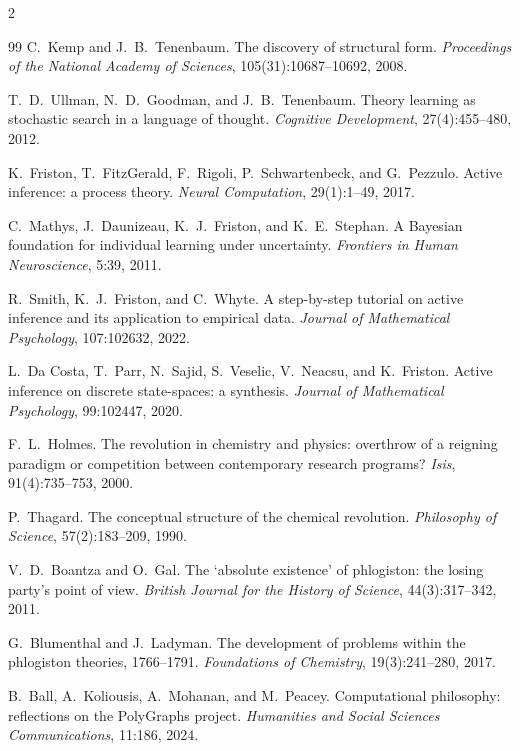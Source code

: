 \documentclass[11pt]{article}
\begin{document}
\begin{multicols}{2}
\begin{thebibliography}{99}
C.~Kemp and J.~B.~Tenenbaum.
The discovery of structural form.
\emph{Proceedings of the National Academy of Sciences}, 105(31):10687--10692, 2008.

T.~D.~Ullman, N.~D.~Goodman, and J.~B.~Tenenbaum.
Theory learning as stochastic search in a language of thought.
\emph{Cognitive Development}, 27(4):455--480, 2012.

K.~Friston, T.~FitzGerald, F.~Rigoli, P.~Schwartenbeck, and G.~Pezzulo.
Active inference: a process theory. \emph{Neural Computation}, 29(1):1--49, 2017.

C.~Mathys, J.~Daunizeau, K.~J.~Friston, and K.~E.~Stephan.
A Bayesian foundation for individual learning under uncertainty.
\emph{Frontiers in Human Neuroscience}, 5:39, 2011.

R.~Smith, K.~J.~Friston, and C.~Whyte.
A step-by-step tutorial on active inference and its application to empirical data.
\emph{Journal of Mathematical Psychology}, 107:102632, 2022.

L.~Da Costa, T.~Parr, N.~Sajid, S.~Veselic, V.~Neacsu, and K.~Friston.
Active inference on discrete state-spaces: a synthesis.
\emph{Journal of Mathematical Psychology}, 99:102447, 2020.

F.~L.~Holmes.
The revolution in chemistry and physics: overthrow of a reigning paradigm or competition between
contemporary research programs? \emph{Isis}, 91(4):735--753, 2000.

P.~Thagard.
The conceptual structure of the chemical revolution.
\emph{Philosophy of Science}, 57(2):183--209, 1990.

V.~D.~Boantza and O.~Gal.
The `absolute existence' of phlogiston: the losing party's point of view.
\emph{British Journal for the History of Science}, 44(3):317--342, 2011.

G.~Blumenthal and J.~Ladyman.
The development of problems within the phlogiston theories, 1766--1791.
\emph{Foundations of Chemistry}, 19(3):241--280, 2017.

B.~Ball, A.~Koliousis, A.~Mohanan, and M.~Peacey.
Computational philosophy: reflections on the {PolyGraphs} project.
\emph{Humanities and Social Sciences Communications}, 11:186, 2024.


\end{thebibliography}
\end{multicols}
\end{document}
